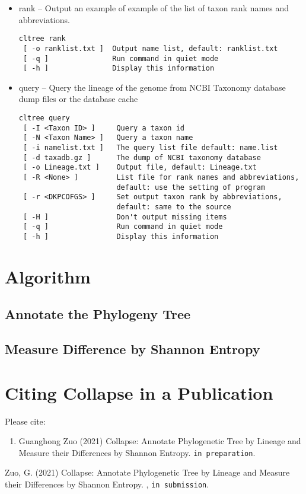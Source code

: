 \documentclass[12pt,a4paper]{article}
\begin{document}
\begin{itemize}
\item rank -- Output an example of example of the list of taxon rank names and abbreviations.
\begin{verbatim}
cltree rank
 [ -o ranklist.txt ]  Output name list, default: ranklist.txt
 [ -q ]               Run command in quiet mode
 [ -h ]               Display this information
\end{verbatim}

\item query -- Query the lineage of the genome from NCBI Taxonomy database dump files or the database cache
\begin{verbatim}
cltree query
 [ -I <Taxon ID> ]     Query a taxon id
 [ -N <Taxon Name> ]   Query a taxon name
 [ -i namelist.txt ]   The query list file default: name.list
 [ -d taxadb.gz ]      The dump of NCBI taxonomy database
 [ -o Lineage.txt ]    Output file, default: Lineage.txt
 [ -R <None> ]         List file for rank names and abbreviations,
                       default: use the setting of program
 [ -r <DKPCOFGS> ]     Set output taxon rank by abbreviations,
                       default: same to the source
 [ -H ]                Don't output missing items
 [ -q ]                Run command in quiet mode
 [ -h ]                Display this information
\end{verbatim}
\end{itemize}

\section{Algorithm}

\subsection{Annotate the Phylogeny Tree}
	
\subsection{Measure Difference by Shannon Entropy}


\section{Citing Collapse in a Publication}
Please cite:
\begin{enumerate}\itemsep 0pt
	\item Guanghong Zuo (2021) Collapse: Annotate Phylogenetic Tree by Lineage and Measure their Differences by Shannon Entropy. {\tt in preparation}.
\end{enumerate}

\begin{thebibliography}{}
	Zuo, G. (2021) Collapse: Annotate Phylogenetic Tree by Lineage and Measure their Differences by Shannon Entropy. , {\tt in submission}.
\end{thebibliography}
\end{document}
